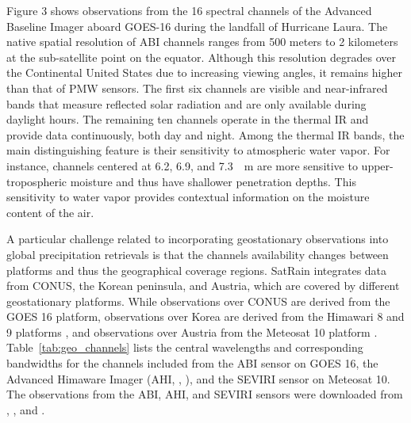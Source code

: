 \documentclass[11pt]{article}
\begin{document}
Figure 3 shows observations from the 16 spectral channels of the Advanced
Baseline Imager aboard GOES-16 during the landfall of Hurricane Laura. The
native spatial resolution of ABI channels ranges from 500 meters to 2 kilometers
at the sub-satellite point on the equator. Although this resolution degrades
over the Continental United States due to increasing viewing angles, it remains
higher than that of PMW sensors. The first six channels are visible and
near-infrared bands that measure reflected solar radiation and are only
available during daylight hours. The remaining ten channels operate in the
thermal IR and provide data continuously, both day and night. Among the thermal
IR bands, the main distinguishing feature is their sensitivity to atmospheric
water vapor. For instance, channels centered at 6.2, 6.9, and \SI{7.3}{\micro
  \meter} are more sensitive to upper-tropospheric moisture and thus have
shallower penetration depths. This sensitivity to water vapor provides
contextual information on the moisture content of the air.

A particular challenge related to incorporating geostationary observations into
global precipitation retrievals is that the channels availability changes
between platforms and thus the geographical coverage regions. SatRain integrates
data from CONUS, the Korean peninsula, and Austria, which are covered by
different geostationary platforms. While observations over CONUS are derived
from the GOES 16 \citep{Goodman2019GOESR} platform, observations over Korea are
derived from the Himawari 8 and 9 platforms \citep{Bessho2016Himawari}, and
observations over Austria from the Meteosat 10 platform
\citep{Schmetz2002Introduction}. Table~\ref{tab:geo_channels} lists the central
wavelengths and corresponding bandwidths for the channels included from the ABI
sensor on GOES 16, the Advanced Himaware Imager (AHI,
\citeauthor{Da2015Preliminary}, \citeyear{Da2015Preliminary}), and the SEVIRI
\citep{Aminou2002Msg} sensor on Meteosat 10. The observations from the ABI, AHI,
and SEVIRI sensors were downloaded from \cite{NOAA_GOES_AWS},
\cite{NOAA_HIMAWARI_AWS}, and \cite{EUMETSAT_SEVIRI}.
\end{document}
